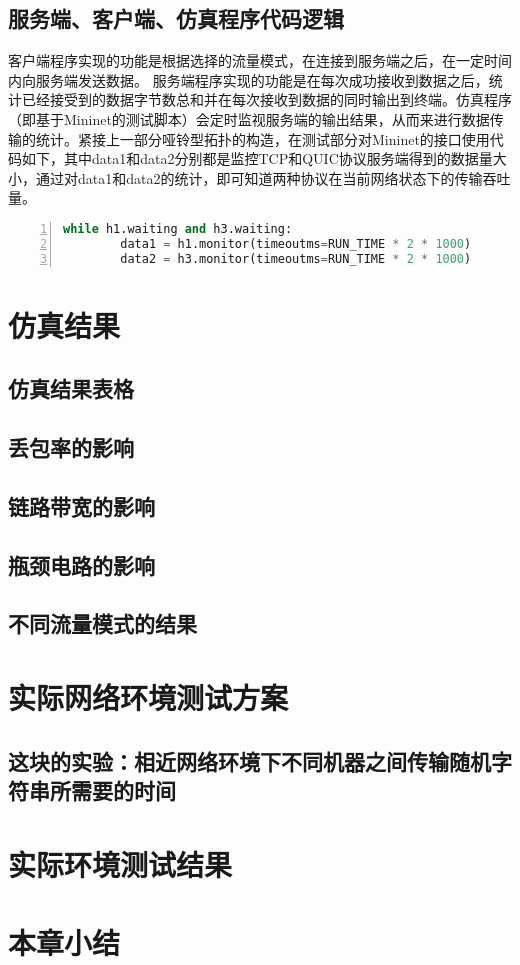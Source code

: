 \subsection{服务端、客户端、仿真程序代码逻辑}
客户端程序实现的功能是根据选择的流量模式，在连接到服务端之后，在一定时间内向服务端发送数据。
服务端程序实现的功能是在每次成功接收到数据之后，统计已经接受到的数据字节数总和并在每次接收到数据的同时输出到终端。仿真程序（即基于Mininet的测试脚本）会定时监视服务端的输出结果，从而来进行数据传输的统计。紧接上一部分哑铃型拓扑的构造，在测试部分对Mininet的接口使用代码如下，其中data1和data2分别都是监控TCP和QUIC协议服务端得到的数据量大小，通过对data1和data2的统计，即可知道两种协议在当前网络状态下的传输吞吐量。
\begin{lstlisting}[language={python},numbers=left]
    while h1.waiting and h3.waiting:
        data1 = h1.monitor(timeoutms=RUN_TIME * 2 * 1000)
        data2 = h3.monitor(timeoutms=RUN_TIME * 2 * 1000)
\end{lstlisting}

\section{仿真结果}
\subsection{仿真结果表格}

\subsection{丢包率的影响}
\subsection{链路带宽的影响}
\subsection{瓶颈电路的影响}
\subsection{不同流量模式的结果}
\section{实际网络环境测试方案}
\subsection{这块的实验：相近网络环境下不同机器之间传输随机字符串所需要的时间}
\section{实际环境测试结果}
\section{本章小结}


